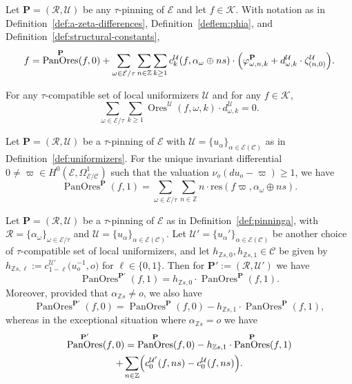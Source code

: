 \documentclass[10pt,a4paper]{amsart}
\DeclareMathOperator{\ores}{Ores}
\DeclareMathOperator{\pano}{PanOres}
\newcommand{\Ca}{\mathcal{C}} %
\newcommand{\Z}{\mathbb{Z}} %
\newcommand{\bk}{\mathcal{K}} %
\newcommand{\ec}{\mathcal{E}} %
\newcommand{\idec}{{o}} %
\newcommand{\orbita}{{\ec/\tau}} %
\newcommand{\za}[2]{\zeta^{\mathcal{U}}_{( {#1} , {#2} )}}
\begin{document}
\begin{lemma}\label{lem:zetaExp-a}
    Let $\mathbf{P}=(\mathcal{R},\mathcal{U})$ be any $\tau$-pinning of $\mathcal{E}$ and let $f\in\bk$. With notation as in Definition~\ref{def:a-zeta-differences},  Definition~\ref{deflem:phia}, and Definition~\ref{def:structural-constants},
    \begin{equation}\label{eq:zetaExp-a}
    f=\pano^\mathbf{P}(f,0)+\sum_{\omega\in\orbita}\sum_{n\in\Z}\sum_{k\geq 1}c^\mathcal{U}_k(f,\alpha_\omega\oplus ns)\cdot\Bigl(\varphi^\mathbf{P}_{\omega,n,k}+d^\mathcal{U}_{\omega,k}\cdot\za{n}{0}\Bigr).
    \end{equation}
\end{lemma}

\begin{corollary} \label{cor:zetaExp-a}For any $\tau$-compatible set of local uniformizers $\mathcal{U}$ and for any $f\in\bk$, \[\sum_{\omega\in\orbita}\sum_{k\geq 1}\ores^\mathcal{U}(f,\omega,k)\cdot d^\mathcal{U}_{\omega,k}=0.\]
\end{corollary}

\begin{proposition} \label{prop:diff-pano}
    Let $\mathbf{P}=(\mathcal{R},\mathcal{U})$ be a $\tau$-pinning of $\ec$ with $\mathcal{U}=\{u_\alpha\}_{\alpha\in\ec(\Ca)}$ as in Definition~\ref{def:uniformizers}. For the unique invariant differential $0\neq\varpi\in H^0(\ec,\Omega^1_{\ec/\Ca})$ such that the valuation $\nu_\idec(du_\idec-\varpi)\geq 1$, we have
    \[\pano^\mathbf{P}(f,1)=\sum_{\omega\in\orbita}\sum_{n\in\Z}n\cdot\mathrm{res}(f\varpi,\alpha_\omega\oplus ns).\]
\end{proposition}

\begin{lemma}\label{lem:pano-pinning-au} Let $\mathbf{P}=(\mathcal{R},\mathcal{U})$ be a $\tau$-pinning of $\ec$ as in Definition~\ref{def:pinninga}, with $\mathcal{R}=\{\alpha_\omega\}_{\omega\in\orbita}$ and $\mathcal{U}=\{u_\alpha\}_{\alpha\in\ec(\Ca)}$. Let $\mathcal{U}'=\{u_\alpha'\}_{\alpha\in\ec(\Ca)}$ be another choice of $\tau$-compatible set of local uniformizers, and let $h_{\Z s,0},h_{\Z s,1}\in\Ca$ be given by $h_{\Z s,\ell}:=c^{\mathcal{U}'}_{1-\ell}\bigl(u_\idec^{-1},\idec\bigr)$ for $\ell\in\{0,1\}$. Then for $\mathbf{P}':=(\mathcal{R},\mathcal{U}')$ we have
\begin{equation}\label{eq:pano-pinning-au1}
    \pano^{\mathbf{P}'}(f,1) =h_{\Z s,0}\cdot \pano^\mathbf{P}(f,1).\end{equation}Moreover, provided that $\alpha_{\Z s}\neq\idec$, we also have
    \begin{equation}
    \pano^{\mathbf{P}'}(f,0) =\pano^\mathbf{P}(f,0)-h_{\Z s,1}\cdot\pano^\mathbf{P}(f,1),\label{eq:pano-pinning-au0-nice}\end{equation}whereas in the exceptional situation where $\alpha_{\Z s}=\idec$ we have
    \begin{multline}\label{eq:pano-pinning-au0-mean}
    \pano^{\mathbf{P}'}(f,0) =\pano^\mathbf{P}(f,0)-h_{\Z s,1}\cdot\pano^\mathbf{P}(f,1)\\ +\sum_{n\in\Z}\Bigl(c^{\mathcal{U}'}_0(f,ns)-c^{\mathcal{U}}_0(f,ns)\Bigr).
\end{multline}
\end{lemma}
\end{document}
